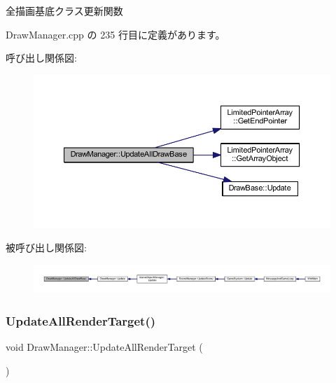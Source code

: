 全描画基底クラス更新関数 



 Draw\+Manager.\+cpp の 235 行目に定義があります。

呼び出し関係図\+:
\nopagebreak
\begin{figure}[H]
\begin{center}
\leavevmode
\includegraphics[width=350pt]{class_draw_manager_a7c989a2beae5de5a1fc7ab0bef8692f9_cgraph}
\end{center}
\end{figure}
被呼び出し関係図\+:
\nopagebreak
\begin{figure}[H]
\begin{center}
\leavevmode
\includegraphics[width=350pt]{class_draw_manager_a7c989a2beae5de5a1fc7ab0bef8692f9_icgraph}
\end{center}
\end{figure}
\mbox{\label{class_draw_manager_a8eb2f1e3957113ae99e8240c40c89744}} 
\subsubsection{\texorpdfstring{Update\+All\+Render\+Target()}{UpdateAllRenderTarget()}}
{\footnotesize\ttfamily void Draw\+Manager\+::\+Update\+All\+Render\+Target (\begin{DoxyParamCaption}{ }\end{DoxyParamCaption})\hspace{0.3cm}{\ttfamily [private]}}



